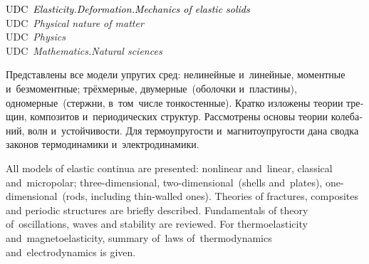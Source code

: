 \begin{minipage}[b]{0.92\linewidth}
{\begin{otherlanguage}{russian}
\end{otherlanguage}

\vspace{0.8em}

\begin{otherlanguage}{english}

{\footnotesize%
\textcolor{black}{UDC~\emph{Elasticity.\:Deformation.\:Mechanics of elastic solids}}\\
\textcolor{black!50}{UDC~\emph{Physical nature of matter}}\\
\textcolor{black!40}{UDC~\emph{Physics}}\\
\textcolor{black!30}{UDC~\emph{Mathematics.\:Natural sciences}}%
\par}

\end{otherlanguage}

\vspace{0.25\paperheight}

\begin{otherlanguage}{russian}

\hspace{12pt} Представлены все модели упругих сред: нелинейные и~линейные, моментные и~безмоментные; трёхмерные, двумерные~(оболочки и~пластины), одномерные~(стержни, в~том~числе тонко\-стен\-ные). Кратко изложены \hbox{теории} трещин, композитов и~периодических структур. Рассмотрены основы теории колебаний, волн и~устойчивости. Для термо\-упругости и~магнито\-упругости дана сводка законов термо\-динамики и~электро\-динамики.

\end{otherlanguage}

\vspace{1.2\baselineskip}

\begin{otherlanguage}{english}

\hspace{12pt} All models of elastic continua are presented: nonlinear and~linear, classical and~micropolar; three\hbox{-}dimensional, two\hbox{-}dimensional~(shells and~plates), one\hbox{-}dimensional~(rods, including thin\hbox{-}walled ones). \hbox{Theories} of fractures, composites and periodic structures are briefly described. Fundamentals of theory of~oscillations, waves and stability are reviewed. For thermoelasticity and~magnetoelasticity, summary of~laws of~thermodynamics and~electrodynamics is given.


\end{otherlanguage}

}
\end{minipage}

\thispagestyle{empty}

\newpage
